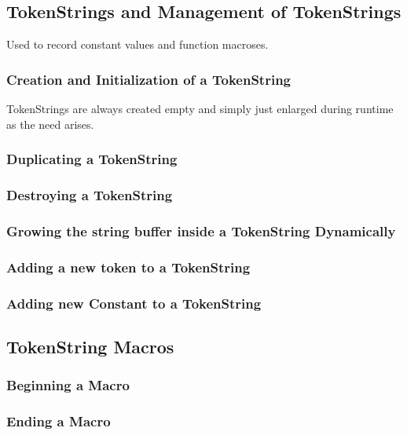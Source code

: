 \subsection{TokenStrings and Management of TokenStrings}

Used to record constant values and function macroses.

\subsubsection{Creation and Initialization of a TokenString}

TokenStrings are always created empty and simply just enlarged during runtime as the need arises.

\subsubsection{Duplicating a TokenString}

\subsubsection{Destroying a TokenString}

\subsubsection{Growing the string buffer inside a TokenString Dynamically}

\subsubsection{Adding a new token to a TokenString}


\subsubsection{Adding new Constant to a TokenString}

\subsection{TokenString Macros}

\subsubsection{Beginning a Macro}

\subsubsection{Ending a Macro}



